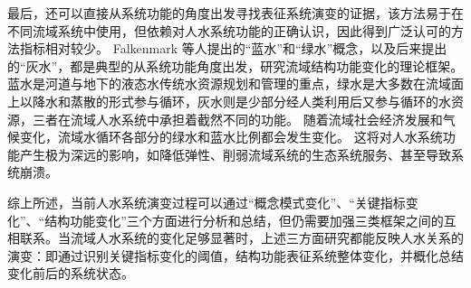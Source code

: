 最后，还可以直接从系统功能的角度出发寻找表征系统演变的证据，该方法易于在不同流域系统中使用，但依赖对人\textendash{}水系统功能的正确认识，因此得到广泛认可的方法指标相对较少。
Falkenmark 等人提出的“蓝水”和“绿水”概念\cite{falkenmark2006}，以及后来提出的“灰水”，都是典型的从系统功能角度出发，研究流域结构\textendash{}功能变化的理论框架\cite{mekonnen2011}。
蓝水是河道与地下的液态水传统水资源规划和管理的重点，绿水是大多数在流域面上以降水和蒸散的形式参与循环，灰水则是少部分经人类利用后又参与循环的水资源，三者在流域人\textendash{}水系统中承担着截然不同的功能\cite{craswell2007}。
随着流域社会经济发展和气候变化，流域水循环各部分的绿水和蓝水比例都会发生变化。
这将对人\textendash{}水系统功能产生极为深远的影响，如降低弹性、削弱流域系统的生态系统服务、甚至导致系统崩溃\cite{falkenmark2019}。

综上所述，当前人\textendash{}水系统演变过程可以通过“概念模式变化”、“关键指标变化”、“结构功能变化”三个方面进行分析和总结，但仍需要加强三类框架之间的互相联系。当流域人\textendash{}水系统的变化足够显著时，上述三方面研究都能反映人\textendash{}水关系的演变：即通过识别关键指标变化的阈值，结构\textendash{}功能表征系统整体变化，并概化总结变化前后的系统状态。
